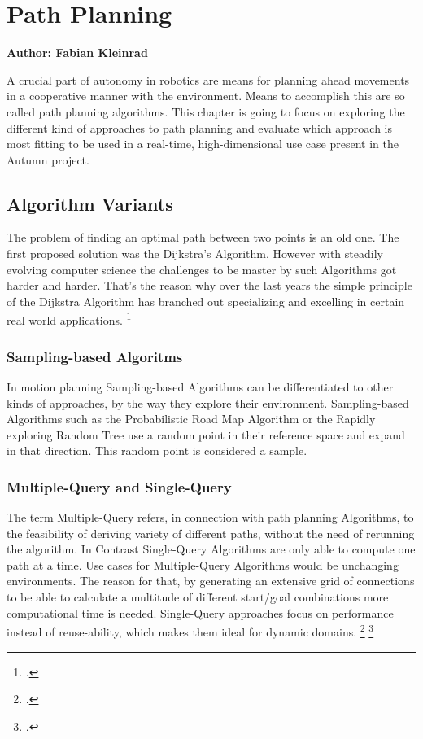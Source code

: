 \chapter{Path Planning}

\textbf{Author: Fabian Kleinrad} 

A crucial part of autonomy in robotics are means for planning ahead movements in a cooperative manner with the environment. Means to accomplish this are so called path planning algorithms. This chapter is going to focus on exploring the different kind of approaches to path planning and evaluate which approach is most fitting to be used in a real-time, high-dimensional use case present in the Autumn project.


\section{Algorithm Variants}

The problem of finding an optimal path between two points is an old one.
The first proposed solution was the Dijkstra's Algorithm. However with steadily evolving computer science the challenges to be master by such Algorithms got harder and harder. That's the reason why over the last years the simple principle of the Dijkstra Algorithm has branched out specializing and excelling in certain real world applications.
\footcite{Pan2020}

\subsection{Sampling-based Algoritms}

In motion planning Sampling-based Algorithms can be differentiated to other kinds of approaches, by the way they explore their environment. Sampling-based Algorithms such as the Probabilistic Road Map Algorithm or the Rapidly exploring Random Tree use a random point in their reference space and expand in that direction. This random point is considered a sample.

\subsection{Multiple-Query and Single-Query}

The term Multiple-Query refers, in connection with path planning Algorithms, to the feasibility of deriving variety of different paths, without the need of rerunning the algorithm. In Contrast Single-Query Algorithms are only able to compute one path at a time.\newline
Use cases for Multiple-Query Algorithms would be unchanging environments. The reason for that, by generating an extensive grid of connections to be able to calculate a multitude of different start/goal combinations  more computational time is needed.\newline
Single-Query approaches focus on performance instead of reuse-ability, which makes them ideal for dynamic domains. 
\footcite{Bekris2003}
\footcite{stackexchangeMultiSingleQuery2019}

